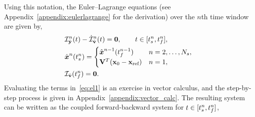 Using this notation, the Euler--Lagrange equations (see
Appendix~\ref{appendix:eulerlagrange} for the derivation) over the $n$th
time window are given by, 
\begin{equation}\label{eq:el1} 
\begin{split}
& \mathcal{I}_{ \hat{\mathbf{y}}}^n(t) - \dot{\mathcal{I}}_{ \hat{\mathbf{v}}}^n(t )  = \boldsymbol 0, \qquad t \in [t_s^{n},t_f^{n}],\\ 
&\hat{ \boldsymbol x}^n(t_s^{n})  = \begin{cases} 
\hat{ \boldsymbol x}^{n-1}(t_f^{n-1}) &
n=2,\ldots,N_s, \\ 
\mathbf {V}^T({{\mathbf{x}}_0} - \mathbf{x}_\text{ref}) & n=1,
\end{cases}\\ 
&\mathcal{I}_{ \hat{\mathbf{v}}} (t_f^{n}) = \boldsymbol 0.
\end{split} 
\end{equation}
Evaluating the terms in~\eqref{eq:el1} is an exercise in
vector calculus, and the step-by-step process is given in
Appendix~\ref{appendix:vector_calc}. The resulting system can be written as the 
coupled forward-backward system for $t \in [t_s^{n},t_f^{n} ]$,
